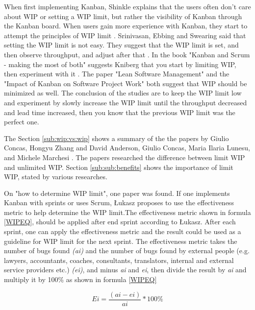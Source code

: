 \documentclass[UKenglish]{ifimaster}  %
\begin{document}
When first implementing Kanban, Shinkle explains that the users often don't care about WIP or setting a WIP limit, but rather the visibility of Kanban through the Kanban board. When users gain more experience with Kanban, they start to attempt the principles of WIP limit \parencite{Shinkle}. Srinivasan, Ebbing and Swearing said that setting the WIP limit is not easy. They suggest that the WIP limit is set, and then observe throughput, and adjust after that \parencite{Mandyam}. In the book "Kanban and Scrum - making the most of both" suggests Kniberg that you start by limiting WIP, then experiment with it \parencite{Kniberg}. The paper "Lean Software Management" \parencite{Kniberg} and the "Impact of Kanban on Software Project Work" \parencite{Ikonen} both suggest that WIP should be minimized as well. The conclusion of the studies are to keep the WIP limit low and experiment by slowly increase the WIP limit until the throughput decreased and lead time increased, then you know that the previous WIP limit was the perfect one.

The Section \ref{sub:wip:vs:wip} shows a summary of the the papers by Giulio Concas, Hongyu Zhang \parencite{SMR:SMR1599}  and David Anderson, Giulio Concas, Maria Ilaria Lunesu, and Michele Marchesi \parencite{DavidAnderson}. The papers researched the difference between limit WIP and unlimited WIP. Section \ref{sub:sub:benefits} shows the importance of limit WIP, stated by various researches. 

On "how to determine WIP limit", one paper was found. If one implements Kanban with sprints or uses Scrum, \L ukasz proposes to use the effectiveness metric to help determine the WIP limit.The effectiveness metric shown in formula \ref{WIPEQ}, should be applied after end sprint according to \L ukasz. After each sprint, one can apply the effectiveness metric and the result could be used as a guideline for WIP limit for the next sprint. The effectiveness metric takes the number of bugs found \textit{(ai)} and the number of bugs found by external people (e.g. lawyers, accountants, coaches, consultants, translators, internal and external service providers etc.) \textit{(ei)}, and minus \textit{ai} and \textit{ei}, then divide the result by \textit{ai} and multiply it by 100\%  as shown in formula \ref{WIPEQ} \parencite{Sienkiewicz}

\begin{equation} \label{WIPEQ}
Ei=\frac{(ai-ei)}{ai}*100\%
\end{equation}
\end{document}
